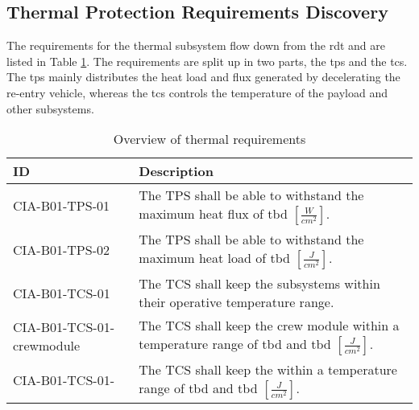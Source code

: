 \subsection{Thermal Protection Requirements Discovery} \label{sec:therm}
The requirements for the thermal subsystem flow down from the \gls{rdt} and are listed in Table \ref{tab:thermalreq}. The requirements are split up in two parts, the \gls{tps} and the \gls{tcs}. The \gls{tps} mainly distributes the heat load and flux generated by decelerating the re-entry vehicle, whereas the \gls{tcs} controls the temperature of the payload and other subsystems.


\begin{table}[H]
	\caption{Overview of thermal requirements}
	\begin{tabular}{|p{}|p{}|}
    \hline
    ID          & Description                                                                                                      \\ \hline \hline
    CIA-B01-TPS-01 & The TPS shall be able to withstand the maximum heat flux of \gls{tbd} $ \left[\frac{W}{cm^2}\right] $.               
\\ \hline
    CIA-B01-TPS-02 &  The TPS shall be able to withstand the maximum heat load of \gls{tbd} $ \left[\frac{J}{cm^2}\right] $.                
\\ \hline
    CIA-B01-TCS-01 & The TCS shall keep the subsystems within their operative temperature range.                                            
\\ \hline
    CIA-B01-TCS-01-crewmodule & The TCS shall keep the crew module within a temperature range of \gls{tbd} and \gls{tbd} $ \left[\frac{J}{cm^2}\right] $.                                        
\\ \hline
    CIA-B01-TCS-01- & The TCS shall keep the  within a temperature range of \gls{tbd} and \gls{tbd} $ \left[\frac{J}{cm^2}\right] $.                                        
\\ \hline

    \end{tabular}
    \label{tab:thermalreq}
\end{table}

